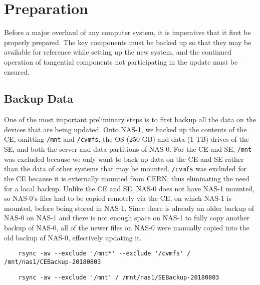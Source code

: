 \documentclass[12pt]{article}
\begin{document}


\section{Preparation}

\qq Before a major overhaul of any computer system, it is imperative that it
first be properly prepared. The key components must be backed up so that they
may be available for reference while setting up the new system, and the
continued operation of tangential components not participating in the update
must be ensured.

\subsection{Backup Data}

\qq One of the most important preliminary steps is to first backup all the data
on the devices that are being updated. Onto NAS-1, we backed up the contents of
the CE, omitting {\tt /mnt} and {\tt /cvmfs}, the OS (250 GB) and data (1 TB)
drives of the SE, and both the server and data partitions of NAS-0. For the CE
and SE, {\tt /mnt} was excluded because we only want to back up data on the CE
and SE rather than the data of other systems that may be mounted. {\tt /cvmfs}
was excluded for the CE because it is externally mounted from CERN, thus
eliminating the need for a local backup. Unlike the CE and SE, NAS-0 does not
have NAS-1 mounted, so NAS-0's files had to be copied remotely via the CE, on
which NAS-1 is mounted, before being stored in NAS-1. Since there is already an
older backup of NAS-0 on NAS-1 and there is not enough space on NAS-1 to fully
copy another backup of NAS-0, all of the newer files on NAS-0 were manually
copied into the old backup of NAS-0, effectively updating it.

\begin{tcolorbox}[title=Backup the CE (executed in CE), colback=white,
  colframe=black, coltitle=green]
  \begin{verbatim}
    rsync -av --exclude '/mnt*' --exclude '/cvmfs' / /mnt/nas1/CEBackup-20180803
  \end{verbatim}
\end{tcolorbox}

\begin{tcolorbox}[title=Backup the SE (executed in SE), colback=white,
  colframe=black, coltitle=green]
  \begin{verbatim}
    rsync -av --exclude '/mnt' / /mnt/nas1/SEBackup-20180803
  \end{verbatim}  
\end{tcolorbox}
\end{document}
